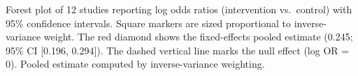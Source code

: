 \caption{Forest plot of 12 studies reporting log odds ratios (intervention vs.\ control) with 95\% confidence intervals. Square markers are sized proportional to inverse-variance weight. The red diamond shows the fixed-effects pooled estimate (0.245; 95\% CI [0.196, 0.294]). The dashed vertical line marks the null effect (log OR = 0). Pooled estimate computed by inverse-variance weighting.}
